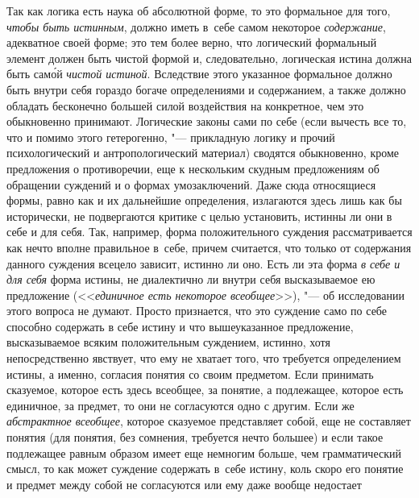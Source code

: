 Так как логика есть наука об абсолютной форме, то это
формальное для того, {\em чтобы быть истинным},
должно иметь в~себе самом некоторое {\em содержание},
адекватное своей форме; это тем более верно, что логический
формальный элемент должен быть чистой формой и, следовательно, логическая
истина должна быть сам\'{о}й {\em чистой истиной}.
Вследствие этого указанное формальное должно быть
внутри себя гораздо богаче определениями и содержанием, а также должно
обладать бесконечно большей силой воздействия на конкретное, чем это
обыкновенно принимают.
Логические законы сами по себе (если вычесть все то, что и
помимо этого гетерогенно, "--- прикладную логику и прочий
психологический и антропологический материал) сводятся обыкновенно, кроме
предложения о противоречии, еще к нескольким скудным предложениям об
обращении суждений и о формах умозаключений. Даже сюда относящиеся формы,
равно как и их дальнейшие определения, излагаются здесь лишь как бы
исторически, не подвергаются критике с целью установить, истинны ли они в
себе и для себя. Так, например, форма положительного суждения
рассматривается как нечто вполне правильное в~себе, причем
считается, что только от содержания данного суждения всецело зависит,
истинно ли оно. Есть ли эта форма {\em в
себе и для себя} форма истины, не диалектично ли внутри себя
высказываемое ею предложение (<<{\em единичное есть некоторое
всеобщее}>>), "--- об исследовании этого вопроса не думают. Просто
признается, что это суждение само по себе способно содержать в
себе истину и что вышеуказанное предложение, высказываемое всяким
положительным суждением, истинно, хотя непосредственно явствует, что ему не
хватает того, что требуется определением истины, а именно, согласия понятия
со своим предметом. Если принимать сказуемое, которое есть здесь всеобщее,
за понятие, а подлежащее, которое есть единичное, за предмет, то они не
согласуются одно с другим. Если же {\em абстрактное всеобщее},
которое сказуемое представляет собой, еще не составляет
понятия (для понятия, без сомнения, требуется нечто большее) и если такое
подлежащее равным образом имеет еще немногим больше, чем грамматический
смысл, то как может суждение содержать в~себе истину, коль скоро его
понятие и предмет между собой не согласуются или ему даже вообще недостает
